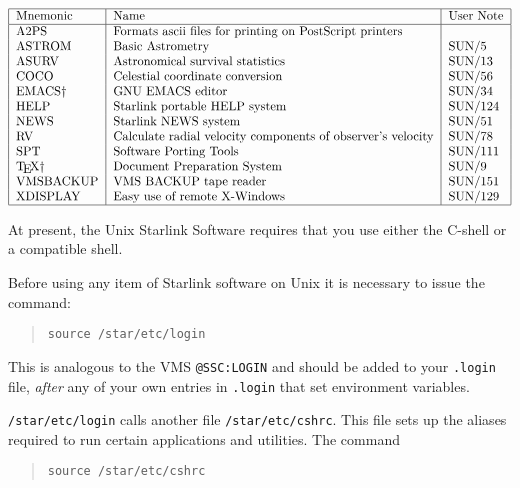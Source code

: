 \begin{table}[htb]\caption{Starlink utilities available on
Unix}\label{utilities}
\[\begin{tabular}{|l|l|l|}
\hline
Mnemonic &Name &User Note\\
\hline
A2PS        & Formats ascii files for printing on PostScript printers & \\
ASTROM      & Basic Astrometry              & SUN/5  \\
ASURV       & Astronomical survival statistics & SUN/13  \\
COCO        & Celestial coordinate conversion & SUN/56 \\
EMACS\dag   & GNU EMACS editor              & SUN/34  \\
HELP        & Starlink portable HELP system    & SUN/124 \\
NEWS        & Starlink NEWS system             & SUN/51 \\
RV          & Calculate radial velocity components of observer's velocity &
SUN/78 \\
SPT         & Software Porting Tools        & SUN/111 \\
\TeX\dag    & Document Preparation System   & SUN/9   \\
VMSBACKUP   & VMS BACKUP tape reader        & SUN/151 \\
XDISPLAY    & Easy use of remote X-Windows  & SUN/129 \\
\hline
\end{tabular}\]
\end{table}

At present, the Unix Starlink Software requires that you use either
the C-shell or a compatible shell.

Before using any item of Starlink software on Unix it is necessary
to issue the command:

\begin{quote}

{\tt source /star/etc/login}

\end{quote}

This is analogous to the VMS \verb~@SSC:LOGIN~
and should be added to your {\tt .login} file, {\it after} any of your
own entries in {\tt .login} that set environment variables.

{\tt /star/etc/login} calls another file {\tt /star/etc/cshrc}. This file sets
up the aliases required to run certain applications and utilities. The command

\begin{quote}

{\tt source /star/etc/cshrc}

\end{quote}

